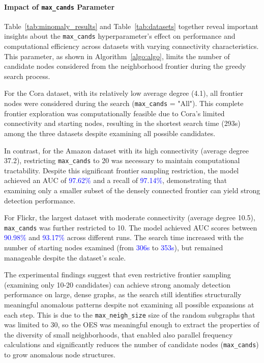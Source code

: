 \documentclass[preprint,12pt]{elsarticle}
\newcommand{\new}[1]{\textcolor{blue}{#1}}
\theoremstyle{plain}
\theoremstyle{definition}
\theoremstyle{remark}
\begin{document}
\paragraph{Impact of \texttt{max\_cands} Parameter}

Table~\ref{tab:minomaly_results} and Table~\ref{tab:datasets} together reveal important insights about the \texttt{max\_cands} hyperparameter's effect on performance and computational efficiency across datasets with varying connectivity characteristics. This parameter, as shown in Algorithm~\ref{algo:algo}, limits the number of candidate nodes considered from the neighborhood frontier during the greedy search process.

For the Cora dataset, with its relatively low average degree (4.1), all frontier nodes were considered during the search (\texttt{max\_cands} = "All"). This complete frontier exploration was computationally feasible due to Cora's limited connectivity and starting nodes, resulting in the shortest search time (293s) among the three datasets despite examining all possible candidates.

In contrast, for the Amazon dataset with its high connectivity (average degree 37.2), restricting \texttt{max\_cands} to 20 was necessary to maintain computational tractability. Despite this significant frontier sampling restriction, the model achieved an AUC of \new{97.62\%} and a recall of \new{97.14\%}, demonstrating that examining only a smaller subset of the densely connected frontier can yield strong detection performance.

For Flickr, the largest dataset with moderate connectivity (average degree 10.5), \texttt{max\_cands} was further restricted to 10. The model achieved AUC scores between \new{90.98\%} and \new{93.17\%} across different runs. The search time increased with the number of starting nodes examined (from \new{306s} to \new{353s}), but remained manageable despite the dataset's scale.

The experimental findings suggest that even restrictive frontier sampling (examining only 10-20 candidates) can achieve strong anomaly detection performance on large, dense graphs, as the search still identifies structurally meaningful anomalous patterns despite not examining all possible expansions at each step. This is due to the \texttt{max\_neigh\_size} size of the random subgraphs that was limited to 30, so the OES was meaningful enough to extract the properties of the diversity of small neighborhoods, that enabled also parallel frequency calculations and significantly reduces the number of candidate nodes (\texttt{max\_cands}) to grow anomalous node structures.
\end{document}
